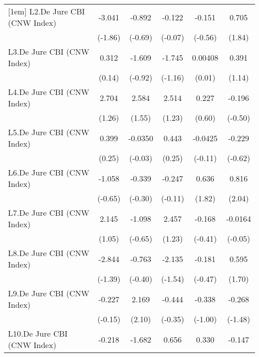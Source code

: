 {\begin{longtable}{l*{5}{c}}
[1em]
L2.De Jure CBI (CNW Index)&   -3.041         &   -0.892         &   -0.122         &   -0.151         &    0.705         \\
                &  (-1.86)         &  (-0.69)         &  (-0.07)         &  (-0.56)         &   (1.84)         \\
[1em]
L3.De Jure CBI (CNW Index)&    0.312         &   -1.609         &   -1.745         &  0.00408         &    0.391         \\
                &   (0.14)         &  (-0.92)         &  (-1.16)         &   (0.01)         &   (1.14)         \\
[1em]
L4.De Jure CBI (CNW Index)&    2.704         &    2.584         &    2.514         &    0.227         &   -0.196         \\
                &   (1.26)         &   (1.55)         &   (1.23)         &   (0.60)         &  (-0.50)         \\
[1em]
L5.De Jure CBI (CNW Index)&    0.399         &  -0.0350         &    0.443         &  -0.0425         &   -0.229         \\
                &   (0.25)         &  (-0.03)         &   (0.25)         &  (-0.11)         &  (-0.62)         \\
[1em]
L6.De Jure CBI (CNW Index)&   -1.058         &   -0.339         &   -0.247         &    0.636         &    0.816\sym{*}  \\
                &  (-0.65)         &  (-0.30)         &  (-0.11)         &   (1.82)         &   (2.04)         \\
[1em]
L7.De Jure CBI (CNW Index)&    2.145         &   -1.098         &    2.457         &   -0.168         &  -0.0164         \\
                &   (1.05)         &  (-0.65)         &   (1.23)         &  (-0.41)         &  (-0.05)         \\
[1em]
L8.De Jure CBI (CNW Index)&   -2.844         &   -0.763         &   -2.135         &   -0.181         &    0.595         \\
                &  (-1.39)         &  (-0.40)         &  (-1.54)         &  (-0.47)         &   (1.70)         \\
[1em]
L9.De Jure CBI (CNW Index)&   -0.227         &    2.169\sym{*}  &   -0.444         &   -0.338         &   -0.268         \\
                &  (-0.15)         &   (2.10)         &  (-0.35)         &  (-1.00)         &  (-1.48)         \\
[1em]
L10.De Jure CBI (CNW Index)&   -0.218         &   -1.682\sym{**} &    0.656         &    0.330         &   -0.147         \\

\end{longtable}}
